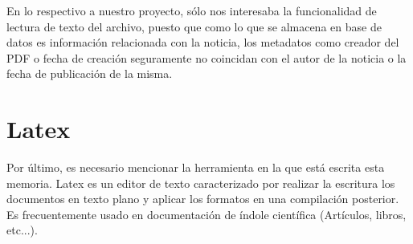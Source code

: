 En lo respectivo a nuestro proyecto, sólo nos interesaba la funcionalidad de lectura de texto del archivo, puesto que como lo que se almacena en base de datos es información relacionada con la noticia, los metadatos como creador del PDF o fecha de creación seguramente no coincidan con el autor de la noticia o la fecha de publicación de la misma.

\section{Latex}

Por último, es necesario mencionar la herramienta en la que está escrita esta memoria. Latex \cite{lamport1994latex} es un editor de texto caracterizado por realizar la escritura los documentos en texto plano y aplicar los formatos en una compilación posterior. Es frecuentemente usado en documentación de índole científica \cite{wiki:latex}(Artículos, libros, etc...).